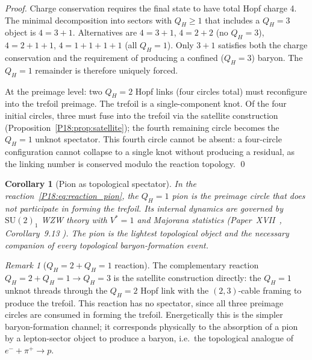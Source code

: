 \documentclass[11pt,a4paper]{article}
\newtheorem{corollary}[theorem]{Corollary}
\theoremstyle{definition}\newtheorem{definition}[theorem]{Definition}
\theoremstyle{remark}
\newtheorem{remark}[theorem]{Remark}
\newcommand{\SU}{\mathrm{SU}}
\newcommand{\QH}{Q_H}
\begin{document}
\begin{proof}
Charge conservation requires the final state to have total Hopf
charge 4.  The minimal decomposition into sectors with $\QH\geq1$
that includes a $\QH=3$ object is $4=3+1$.  Alternatives are
$4=3+1$, $4=2+2$ (no $\QH=3$), $4=2+1+1$, $4=1+1+1+1$ (all $\QH=1$).
Only $3+1$ satisfies both the charge conservation and the requirement
of producing a confined ($\QH=3$) baryon.  The $\QH=1$ remainder is
therefore uniquely forced.

At the preimage level: two $\QH=2$ Hopf links (four circles total)
must reconfigure into the trefoil preimage.  The trefoil is a
single-component knot.  Of the four initial circles, three must
fuse into the trefoil via the satellite construction
(Proposition~\ref{P18:prop:satellite}); the fourth remaining circle
becomes the $\QH=1$ unknot spectator.  This fourth circle cannot
be absent: a four-circle configuration cannot collapse to a single
knot without producing a residual, as the linking number is conserved
modulo the reaction topology.
\qed
\end{proof}

\begin{corollary}[Pion as topological spectator]
\label{P18:cor:pion_spectator}
In the reaction~\eqref{P18:eq:reaction_pion}, the $\QH=1$ pion is the
preimage circle that does not participate in forming the trefoil.
Its internal dynamics are governed by $\SU(2)_1$ WZW theory with
$V^*=1$ and Majorana statistics (Paper~XVII~\cite{Paper17},
Corollary~9.13%
).  The pion is the lightest
topological object and the necessary companion of every
topological baryon-formation event.
\end{corollary}

\begin{remark}[$\QH=2+\QH=1$ reaction]
\label{P18:rem:qh2_qh1}
The complementary reaction
$\QH=2+\QH=1\to\QH=3$ is the satellite construction directly:
the $\QH=1$ unknot threads through the $\QH=2$ Hopf link with
the $(2,3)$-cable framing to produce the trefoil.  This reaction
has no spectator, since all three preimage circles are consumed
in forming the trefoil.  Energetically this is the simpler
baryon-formation channel; it corresponds physically to the
absorption of a pion by a lepton-sector object to produce a baryon,
i.e.\ the topological analogue of $e^-+\pi^+\to p$.
\end{remark}
\end{document}
